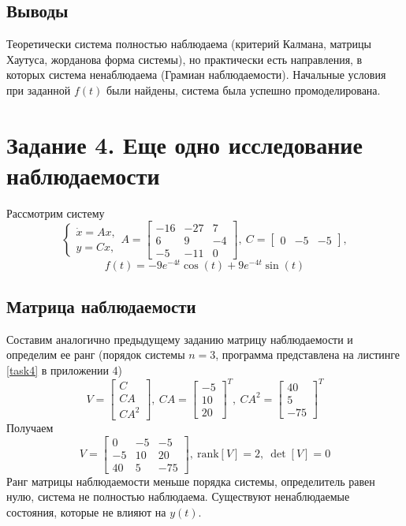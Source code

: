 \documentclass[a4paper, 12pt]{article}
\begin{document}
    \subsection{Выводы}
    Теоретически система полностью наблюдаема (критерий Калмана, матрицы Хаутуса, жорданова форма системы), но практически есть направления, в которых система ненаблюдаема (Грамиан наблюдаемости).
    Начальные условия при заданной $f(t)$ были найдены, система была успешно промоделирована.


    \section{Задание 4. Еще одно исследование наблюдаемости}
    Рассмотрим систему
    $$
    \begin{cases}
        \dot{x}=Ax,\\
        y=Cx,
    \end{cases} A=\begin{bmatrix}
        -16 &-27 &7\\
        6 &9 &-4\\
        -5 &-11 &0
    \end{bmatrix},\ C=\begin{bmatrix}
        0 &-5 &-5
    \end{bmatrix},
    $$
    $$f(t)=-9e^{-4t}\cos{(t)}+9e^{-4t}\sin{(t)}$$


    \subsection{Матрица наблюдаемости}
    Составим аналогично предыдущему заданию матрицу наблюдаемости и определим ее ранг
    (порядок системы $n=3$, программа представлена на листинге \ref{task4} в приложении 4)
    $$
    V=\begin{bmatrix}
        C\\
        CA\\
        CA^2
    \end{bmatrix},\ CA=\begin{bmatrix}
        -5\\    10\\    20
    \end{bmatrix}^T,\ CA^2=\begin{bmatrix}
        40\\     5\\   -75
    \end{bmatrix}^T
    $$
    Получаем
    $$
    V=\begin{bmatrix}
    0    &-5    &-5\\
    -5    &10    &20\\
    40     &5   &-75
    \end{bmatrix},\ \text{rank}\left[V\right]=2,\ \det{\left[V\right]}=0
    $$
    Ранг матрицы наблюдаемости меньше порядка системы, определитель равен нулю, система не полностью наблюдаема.
    Существуют ненаблюдаемые состояния, которые не влияют на $y(t)$.
\end{document}
